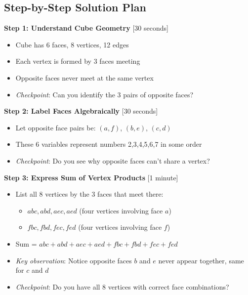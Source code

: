 \documentclass[]{article}
\begin{document}
\begin{solutionbox}
\subsection*{Step-by-Step Solution Plan}

\textbf{Step 1: Understand Cube Geometry} [30 seconds]
\begin{itemize}
    \item Cube has 6 faces, 8 vertices, 12 edges
    \item Each vertex is formed by 3 faces meeting
    \item Opposite faces never meet at the same vertex
    \item \textit{Checkpoint}: Can you identify the 3 pairs of opposite faces?
\end{itemize}

\textbf{Step 2: Label Faces Algebraically} [30 seconds]
\begin{itemize}
    \item Let opposite face pairs be: $(a,f)$, $(b,e)$, $(c,d)$
    \item These 6 variables represent numbers 2,3,4,5,6,7 in some order
    \item \textit{Checkpoint}: Do you see why opposite faces can't share a vertex?
\end{itemize}

\textbf{Step 3: Express Sum of Vertex Products} [1 minute]
\begin{itemize}
    \item List all 8 vertices by the 3 faces that meet there:
    \begin{itemize}
        \item $abc, abd, aec, aed$ (four vertices involving face $a$)
        \item $fbc, fbd, fec, fed$ (four vertices involving face $f$)
    \end{itemize}
    \item Sum = $abc + abd + aec + aed + fbc + fbd + fec + fed$
    \item \textit{Key observation}: Notice opposite faces $b$ and $e$ never appear together, same for $c$ and $d$
    \item \textit{Checkpoint}: Do you have all 8 vertices with correct face combinations?
\end{itemize}


\end{solutionbox}
\end{document}
